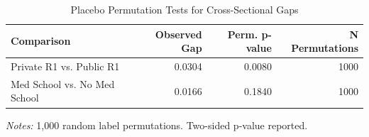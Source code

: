 \begin{table}[H]
\centering
\caption{Placebo Permutation Tests for Cross-Sectional Gaps}
\label{tab:tableE1_permutation}
\begin{threeparttable}
\small
\begin{tabular}{lrrr}
\toprule
\textbf{Comparison} & \textbf{Observed Gap} & \textbf{Perm. p-value} & \textbf{N Permutations} \\
\midrule
Private R1 vs. Public R1 & 0.0304 & 0.0080 & 1000 \\
Med School vs. No Med School & 0.0166 & 0.1840 & 1000 \\
\bottomrule
\end{tabular}
\begin{tablenotes}\small
\item \textit{Notes:} 1,000 random label permutations. Two-sided p-value reported.
\end{tablenotes}
\end{threeparttable}
\end{table}